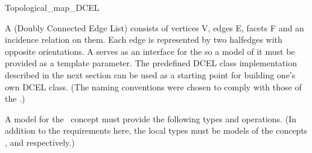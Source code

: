 
\ccRefPageBegin


\begin{ccRefConcept}{Topological_map_DCEL}

A  (Doubly Connected Edge List) consists of vertices V, edges E, facets F and an incidence relation on them. Each edge is
represented by two halfedges with opposite orientations. 
A  serves as an interface for the  so a model of it must be provided as a template parameter.
The predefined DCEL class
implementation described in the next section can be used 
as a starting point for
building one's own DCEL class. (The naming conventions were chosen to comply 
with those of the .)

A model for the \ccRefName\ concept must provide the following types and operations. 
(In addition to the requirements here, the local types 
must be models of the concepts 
,
 and
 respectively.)


\ccTypes

	\ccGlue
	\ccGlue
	\ccGlue


	\ccGlue
	\ccGlue



\end{ccRefConcept}
